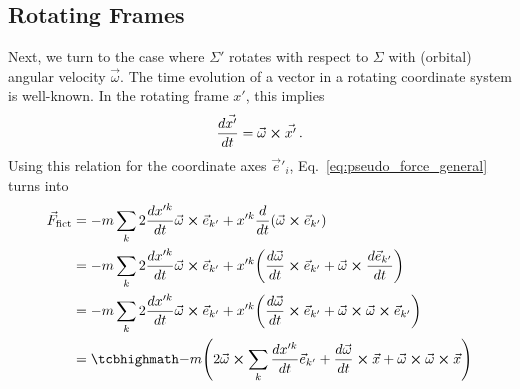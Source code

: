 \documentclass[../class_mech_main.tex]{subfiles}
\begin{document}
        \subsection{Rotating Frames}
Next, we turn to the case where $\Sigma'$ rotates with respect to $\Sigma$ with (orbital) angular velocity $\vec{\omega}$. The time evolution of a vector in a rotating coordinate system is well-known.  In the rotating frame $x'$, this implies
\begin{equation}
    \dv{\vec{x'}}{t} = \vec{\omega} \cross \vec{x'} \, .
\end{equation}
Using this relation for the coordinate axes $\vec{e}'_i$, Eq.~\eqref{eq:pseudo_force_general} turns into
\begin{align}
	\vec{F}_\mathrm{fict} &= - m \sum_k 2 \dv{x'^k}{t} \vec{\omega} \cross \unitvec{k'} + x'^k \dv{t} \qty(\vec{\omega} \cross \unitvec{k'})
	\notag\\
	&= - m \sum_k 2 \dv{x'^k}{t} \vec{\omega} \cross \unitvec{k'} + x'^k \qty(\dv{\vec{\omega}}{t} \cross \unitvec{k'} + \vec{\omega} \cross \dv{\unitvec{k'}}{t})
	\notag\\
	&= - m \sum_k 2 \dv{x'^k}{t} \vec{\omega} \cross \unitvec{k'} + x'^k \qty(\dv{\vec{\omega}}{t} \cross \unitvec{k'} + \vec{\omega} \cross \vec{\omega} \cross \unitvec{k'})
	\notag\\
	&= \eqbox{
		- m \qty(2 \vec{\omega} \cross \sum_k \dv{x'^k}{t} \unitvec{k'} + \dv{\vec{\omega}}{t} \cross \vec{x} + \vec{\omega} \cross \vec{\omega} \cross \vec{x})
	}
    \label{eq:pseudo_force_rot_frame}
\end{align}
\end{document}
